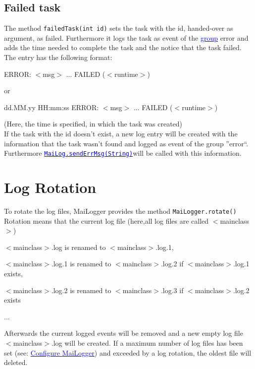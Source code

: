 \documentclass{article}
\newcommand{\refh}[2]{\hyperref[#1] {\textcolor{blue}{#2}}}
\newcommand{\tab}[1][1]{\hspace*{#1cm}}
\newcommand{\sendErr}{\refh{setup_interface}{\lstinline|MaiLog.sendErrMsg(String)|}}
\begin{document}
    \subsection{Failed task}
    \label{tasks_failedTask}
    The method \lstinline|failedTask(int id)| sets the task with the id, handed-over as argument, as failed.
    Furthermore it logs the task as event of the \refh{logging_groups}{group} error and adds the time needed to complete the task and the notice that the task failed.
    The entry has the following format:
    \begin{description}
        \item ERROR: $<$msg$>$ ... FAILED ($<$runtime$>$)
        \item or
        \item dd.MM.yy HH:mm:ss ERROR: $<$msg$>$ ... FAILED ($<$runtime$>$)
    \end{description}
    (Here, the time is specified, in which the task was created) \\
    If the task with the id doesn't exist, a new log entry will be created with the information that the task wasn't found and logged as event of the group ''error``.
    Furthermore \sendErr will be called with this information.

\section{Log Rotation}
\label{rotate}
    To rotate the log files, MaiLogger provides the method \lstinline|MaiLogger.rotate()|
    Rotation means that the current log file (here,all log files are called $<$mainclass$>$)
    \begin{description}
        \item $<$mainclass$>$.log is renamed to $<$mainclass$>$.log.1,
        \item $<$mainclass$>$.log.1 is renamed to $<$mainclass$>$.log.2 if $<$mainclass$>$.log.1 exists,
        \item $<$mainclass$>$.log.2 is renamed to $<$mainclass$>$.log.3 if $<$mainclass$>$.log.2 exists
        \item \tab[5]...
    \end{description}
    Afterwards the current logged events will be removed and a new empty log file $<$mainclass$>$.log will be created.
    If a maximum number of log files has been set (see: \refh{setup_mailogger.setup}{Configure MaiLogger}) and exceeded by a log rotation, the oldest file will deleted.
\end{document}
